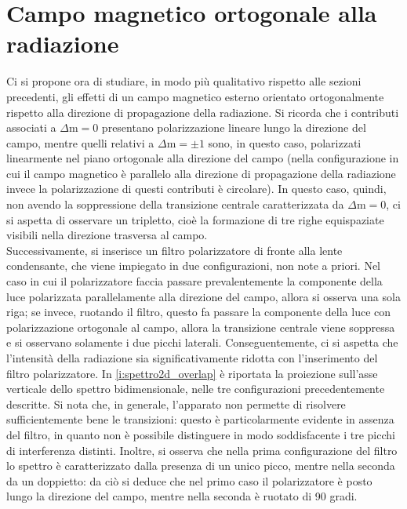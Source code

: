 \documentclass[twocolumn,10pt]{asme2ej}
\begin{document}


\vspace{-10pt}
\section{Campo magnetico ortogonale alla radiazione}\label{s:ortogonale}

Ci si propone ora di studiare, in modo più qualitativo rispetto alle sezioni precedenti, gli effetti di un campo
magnetico esterno orientato ortogonalmente rispetto alla direzione di propagazione della radiazione. Si  ricorda che i
contributi associati a $\Delta \text{m} = 0$ presentano polarizzazione lineare lungo la direzione del campo, mentre
quelli relativi a $\Delta \text{m} = \pm 1$ sono, in questo caso, polarizzati linearmente nel piano ortogonale alla
direzione del campo (nella configurazione in cui il campo magnetico è parallelo alla direzione di propagazione della
radiazione invece la polarizzazione di questi contributi è circolare). In questo caso, quindi, non avendo la
soppressione della transizione centrale caratterizzata da $\Delta \text{m} = 0$, ci si aspetta di osservare un
tripletto, cioè la formazione di tre righe equispaziate visibili nella direzione trasversa al campo. \\
Successivamente, si inserisce un filtro polarizzatore di fronte alla lente condensante, che viene impiegato in due
configurazioni, non note a priori. Nel caso in cui il polarizzatore faccia passare prevalentemente la componente della
luce polarizzata parallelamente alla direzione del campo, allora si osserva una sola riga; se invece, ruotando il
filtro, questo fa passare la componente della luce con polarizzazione ortogonale al campo, allora la transizione
centrale viene soppressa e si osservano solamente i due picchi laterali. Conseguentemente, ci si aspetta che l'intensità
della radiazione sia significativamente ridotta con l'inserimento del filtro polarizzatore.  
In \autoref{i:spettro2d_overlap} è riportata la proiezione sull'asse verticale dello spettro bidimensionale, nelle tre
configurazioni precedentemente descritte. Si nota che, in generale, l'apparato non permette di risolvere
sufficientemente bene le transizioni: questo è particolarmente evidente in assenza del filtro, in quanto non è possibile
distinguere in modo soddisfacente i tre picchi di interferenza distinti. Inoltre, si osserva che nella prima
configurazione del filtro lo spettro è caratterizzato dalla presenza di un unico picco, mentre nella seconda da un
doppietto: da ciò si deduce che nel primo caso il polarizzatore è posto lungo la direzione del campo, mentre nella
seconda è ruotato di 90 gradi. 
\end{document}

